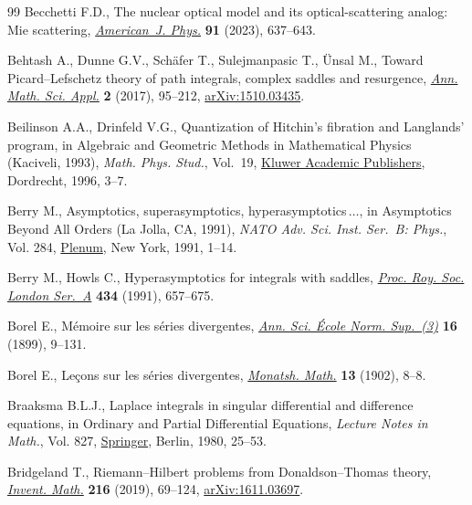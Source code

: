 \documentclass[pdftex]{sigma}
\numberwithin{equation}{section}
\begin{document}
\begin{thebibliography}{99}
Becchetti F.D., The nuclear optical model and its optical-scattering analog:
 {M}ie scattering,
 \href{https://doi.org/10.1119/5.0152813}{\textit{American~J. Phys.}}
 \textbf{91} (2023), 637--643.

Behtash A., Dunne G.V., Sch\"afer T., Sulejmanpasic T., \"Unsal M., Toward
 {P}icard--{L}efschetz theory of path integrals, complex saddles and
 resurgence, \href{https://doi.org/10.4310/AMSA.2017.v2.n1.a3}{\textit{Ann.
 Math. Sci. Appl.}} \textbf{2} (2017), 95--212,
 \href{http://arxiv.org/abs/1510.03435}{arXiv:1510.03435}.

Beilinson A.A., Drinfeld V.G., Quantization of {H}itchin's fibration and
 {L}anglands' program, in Algebraic and {G}eometric {M}ethods in
 {M}athematical {P}hysics ({K}aciveli, 1993), \textit{Math. Phys. Stud.},
 Vol.~19, \href{https://doi.org/10.1007/978-94-017-0693-3_1}{Kluwer Academic
 Publishers}, Dordrecht, 1996, 3--7.

Berry M., Asymptotics, superasymptotics, hyperasymptotics{$\,\dots$}, in
 Asymptotics {B}eyond {A}ll {O}rders ({L}a {J}olla, {CA}, 1991), \textit{NATO
 Adv. Sci. Inst. Ser.~B: Phys.}, Vol. 284,
 \href{https://doi.org/10.1007/978-1-4757-0435-8_1}{Plenum}, New York, 1991,
 1--14.

Berry M., Howls C., Hyperasymptotics for integrals with saddles,
 \href{https://doi.org/10.1098/rspa.1991.0119}{\textit{Proc. Roy. Soc. London
 Ser.~A}} \textbf{434} (1991), 657--675.

Borel E., M\'emoire sur les s\'eries divergentes,
 \href{https://doi.org/10.24033/asens.463}{\textit{Ann. Sci. \'Ecole Norm.
 Sup.~(3)}} \textbf{16} (1899), 9--131.

Borel E., Le\c{c}ons sur les s\'eries divergentes,
 \href{https://doi.org/10.1007/BF01703288}{\textit{Monatsh. Math.}}
 \textbf{13} (1902), 8--8.

Braaksma B.L.J., Laplace integrals in singular differential and difference
 equations, in Ordinary and {P}artial {D}ifferential {E}quations,
 \textit{Lecture Notes in Math.}, Vol. 827,
 \href{https://doi.org/10.1007/BFb0091373}{Springer}, Berlin, 1980, 25--53.

Bridgeland T., Riemann--{H}ilbert problems from {D}onaldson--{T}homas theory,
 \href{https://doi.org/10.1007/s00222-018-0843-8}{\textit{Invent. Math.}}
 \textbf{216} (2019), 69--124,
 \href{http://arxiv.org/abs/1611.03697}{arXiv:1611.03697}.


\end{thebibliography}
\end{document}
